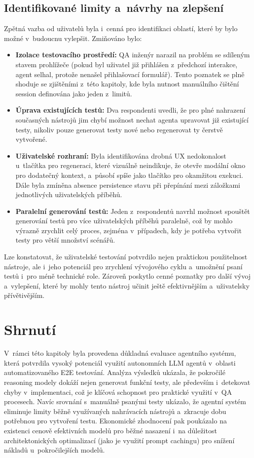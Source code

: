 \documentclass[czech, ing, kiv, he, iso690numb, viewonly]{fasthesis}
\begin{document}
\subsection*{Identifikované limity a~návrhy na zlepšení}
Zpětná vazba od uživatelů byla i~cenná pro identifikaci oblastí, které by bylo možné v~budoucnu vylepšit.
Zmiňováno bylo:

\begin{itemize}
    \item \textbf{Izolace testovacího prostředí:} QA inženýr narazil na problém se 
    sdíleným stavem prohlížeče (pokud byl uživatel již přihlášen z~předchozí interakce, agent selhal, protože nenašel 
    přihlašovací formulář). Tento poznatek se plně shoduje se zjištěními z~této kapitoly, 
    kde byla nutnost manuálního čištění session definována jako jeden z~limitů.
    \item \textbf{Úprava existujících testů:} Dva respondenti uvedli, že pro 
    plné nahrazení současných nástrojů jim chybí možnost nechat agenta upravovat již existující
     testy, nikoliv pouze generovat testy nové nebo regenerovat ty čerstvě vytvořené.
    \item \textbf{Uživatelské rozhraní:} Byla identifikována drobná UX nedokonalost u~tlačítka pro
     regeneraci, které vizuálně neindikuje, že otevře modální okno pro dodatečný kontext, a~působí spíše 
     jako tlačítko pro okamžitou exekuci. Dále byla zmíněna absence persistence stavu při přepínání mezi 
     záložkami jednotlivých uživatelských příběhů.
    \item \textbf{Paralelní generování testů:} Jeden z~respondentů navrhl možnost spouštět generování testů 
    pro více uživatelských příběhů paralelně, což by mohlo výrazně zrychlit celý proces, zejména v~případech, 
    kdy je potřeba vytvořit testy pro větší množství scénářů.
\end{itemize}

Lze konstatovat, že uživatelské testování potvrdilo nejen praktickou použitelnost nástroje, 
ale i~jeho potenciál pro zrychlení vývojového cyklu a~umožnění psaní testů i~pro méně technické role.
Zároveň poskytlo cenné poznatky pro další vývoj a~vylepšení, které by mohly tento nástroj 
učinit ještě efektivnějším a~uživatelsky přívětivějším.

\section{Shrnutí}
V~rámci této kapitoly byla provedena důkladná evaluace agentního systému, 
která potvrdila vysoký potenciál využití autonomních LLM agentů v~oblasti 
automatizovaného E2E testování. Analýza výsledků ukázala, 
že pokročilé reasoning modely dokáží nejen generovat funkční testy, 
ale především i~detekovat chyby v~implementaci, což je klíčová schopnost pro praktické využití v~QA procesech.
Navíc srovnání s~manuálně psanými testy ukázalo, 
že agentní systém eliminuje limity běžně využívaných nahrávacích nástrojů a~zkracuje 
dobu potřebnou pro vytvoření testu. Ekonomické zhodnocení pak poukázalo na existenci 
cenově efektivních modelů pro běžné nasazení i~na důležitost architektonických optimalizací 
(jako je využití prompt cachingu) pro snížení nákladů u~pokročilejších modelů.
\end{document}
